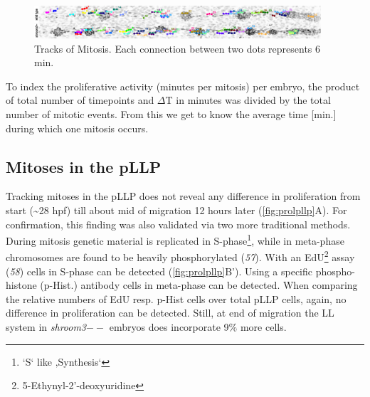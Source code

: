 \documentclass[11pt,singlespacinge,twoside]{reedthesis} %
\begin{document}
\begin{figure}

{\centering \includegraphics[width=0.95\textwidth]{figures/results/02_proliferation/prol_labs} 

}

\caption[Tracks of Mitosis]{Tracks of Mitosis. Each connection between two dots represents 6 min.}\label{fig:prollabs}
\end{figure}
To index the proliferative activity (minutes per mitosis) per embryo, the product of total number of timepoints and \(\Delta\)T in minutes was divided by the total number of mitotic events. From this we get to know the average time {[}min.{]} during which one mitosis occurs.

\newline

\hypertarget{res-prolpllp}{%
\subsection{Mitoses in the pLLP}\label{res-prolpllp}}

Tracking mitoses in the pLLP does not reveal any difference in proliferation from start (\textasciitilde{}28 hpf) till about mid of migration 12 hours later (\ref{fig:prolpllp}A). For confirmation, this finding was also validated via two more traditional methods. During mitosis genetic material is replicated in S-phase\footnote{`S` like ‚Synthesis`}, while in meta-phase chromosomes are found to be heavily phosphorylated (\emph{57}). With an EdU\footnote{5-Ethynyl-2'-deoxyuridine} assay (\emph{58}) cells in S-phase can be detected (\ref{fig:prolpllp}B'). Using a specific phospho-histone (p-Hist.) antibody cells in meta-phase can be detected. When comparing the relative numbers of EdU resp. p-Hist cells over total pLLP cells, again, no difference in proliferation can be detected. Still, at end of migration the LL system in \emph{shroom3}\(--\) embryos does incorporate 9\(\%\) more cells.
\end{document}
